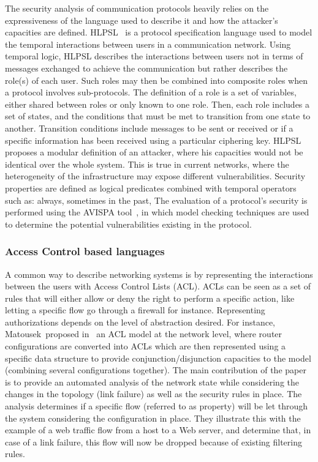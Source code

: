 The security analysis of communication protocols heavily relies on the expressiveness of the language used to describe it and how the attacker's capacities are defined. HLPSL~\cite{HLPSL-Chevalier2004} is a protocol specification language used to model the temporal interactions between users in a communication network. Using temporal logic, HLPSL describes the interactions between users not in terms of messages exchanged to achieve the communication but rather describes the role(s) of each user. Such roles may then be combined into composite roles when a protocol involves sub-protocols.
The definition of a role is a set of variables, either shared between roles or only known to one role.
Then, each role includes a set of states, and the conditions that must be met to transition from one state to another. Transition conditions include messages to be sent or received or if a specific information has been received using a particular ciphering key.
HLPSL proposes a modular definition of an attacker, where his capacities would not be identical over the whole system.
This is true in current networks, where the heterogeneity of the infrastructure may expose different vulnerabilities.
Security properties are defined as logical predicates combined with temporal operators such as: always, sometimes in the past, \etc
The evaluation of a protocol's security is performed using the AVISPA tool~\cite{avispa}, in which model checking techniques are used to determine the potential vulnerabilities existing in the protocol.

\subsubsection{Access Control based languages}
A common way to describe networking systems is by representing the interactions between the users with Access Control Lists (ACL).
ACLs can be seen as a set of rules that will either allow or deny the right to perform a specific action, like letting a specific flow go through a firewall for instance.
Representing authorizations depends on the level of abstraction desired.
For instance, Matousek~\etal proposed in~\cite{Matousek2008} an ACL model at the network level, where router configurations are converted into ACLs which are then represented using a specific data structure to provide conjunction/disjunction capacities to the model (\ie combining several configurations together).
The main contribution of the paper is to provide an automated analysis of the network state while considering the changes in the topology (\ie link failure) as well as the security rules in place.
The analysis determines if a specific flow (referred to as property) will be let through the system considering the configuration in place. They illustrate this with the example of a web traffic flow from a host to a Web server, and determine that, in case of a link failure, this flow will now be dropped because of existing filtering rules.

